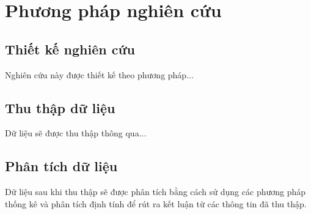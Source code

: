 \section{Phương pháp nghiên cứu}
\subsection{Thiết kế nghiên cứu}
Nghiên cứu này được thiết kế theo phương pháp...

\subsection{Thu thập dữ liệu}
Dữ liệu sẽ được thu thập thông qua...

\subsection{Phân tích dữ liệu}
Dữ liệu sau khi thu thập sẽ được phân tích bằng cách sử dụng các phương pháp thống kê \cite{CitekeyInbook} và phân tích định tính để rút ra kết luận từ các thông tin đã thu thập.
